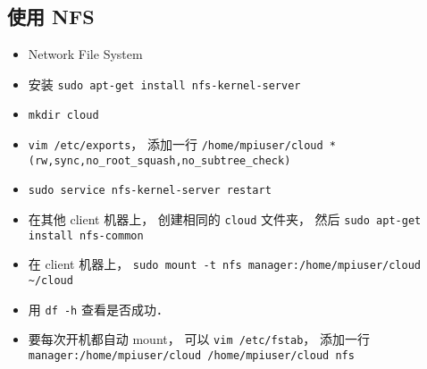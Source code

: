 \subsection{使用 NFS}
\begin{itemize}
\item Network File System
\item 安装 \verb|sudo apt-get install nfs-kernel-server|
\item \verb|mkdir cloud|
\item \verb|vim /etc/exports|， 添加一行 \verb|/home/mpiuser/cloud *(rw,sync,no_root_squash,no_subtree_check)|
\item \verb|sudo service nfs-kernel-server restart|
\item 在其他 client 机器上， 创建相同的 \verb|cloud| 文件夹， 然后 \verb|sudo apt-get install nfs-common|
\item 在 client 机器上， \verb|sudo mount -t nfs manager:/home/mpiuser/cloud ~/cloud|
\item 用 \verb|df -h| 查看是否成功．
\item 要每次开机都自动 mount， 可以 \verb|vim /etc/fstab|， 添加一行 \verb|manager:/home/mpiuser/cloud /home/mpiuser/cloud nfs|
\end{itemize}
